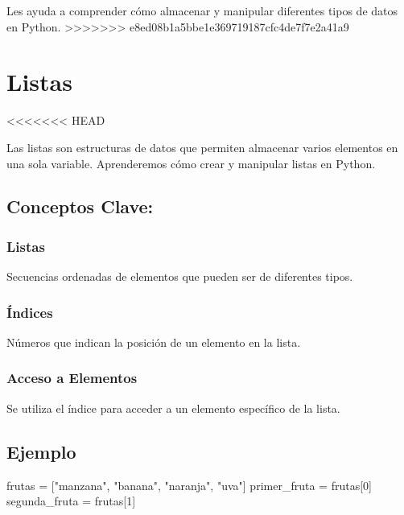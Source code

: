 \documentclass[
  a4paper,
  onepage,
  openany]{scrreprt}
\newenvironment{Shaded}{\begin{snugshade}}{\end{snugshade}}
\newcommand{\DecValTok}[1]{\textcolor[rgb]{0.68,0.00,0.00}{#1}}
\newcommand{\NormalTok}[1]{\textcolor[rgb]{0.00,0.23,0.31}{#1}}
\newcommand{\OperatorTok}[1]{\textcolor[rgb]{0.37,0.37,0.37}{#1}}
\newcommand{\StringTok}[1]{\textcolor[rgb]{0.13,0.47,0.30}{#1}}
\begin{document}
Les ayuda a comprender cómo almacenar y manipular diferentes tipos de
datos en Python.
\textgreater\textgreater\textgreater\textgreater\textgreater\textgreater\textgreater{}
e8ed08b1a5bbe1e369719187cfc4de7f7e2a41a9

\hypertarget{listas}{%
\chapter{Listas}\label{listas}}

\textless\textless\textless\textless\textless\textless\textless{} HEAD

Las listas son estructuras de datos que permiten almacenar varios
elementos en una sola variable. Aprenderemos cómo crear y manipular
listas en Python.

\hypertarget{conceptos-clave-18}{%
\section{Conceptos Clave:}\label{conceptos-clave-18}}

\hypertarget{listas-1}{%
\subsection{Listas}\label{listas-1}}

Secuencias ordenadas de elementos que pueden ser de diferentes tipos.

\hypertarget{uxedndices}{%
\subsection{Índices}\label{uxedndices}}

Números que indican la posición de un elemento en la lista.

\hypertarget{acceso-a-elementos}{%
\subsection{Acceso a Elementos}\label{acceso-a-elementos}}

Se utiliza el índice para acceder a un elemento específico de la lista.

\hypertarget{ejemplo-18}{%
\section{Ejemplo}\label{ejemplo-18}}

\begin{Shaded}
\begin{Highlighting}[]
\NormalTok{frutas }\OperatorTok{=}\NormalTok{ [}\StringTok{"manzana"}\NormalTok{, }\StringTok{"banana"}\NormalTok{, }\StringTok{"naranja"}\NormalTok{, }\StringTok{"uva"}\NormalTok{]}
\NormalTok{primer\_fruta }\OperatorTok{=}\NormalTok{ frutas[}\DecValTok{0}\NormalTok{]}
\NormalTok{segunda\_fruta }\OperatorTok{=}\NormalTok{ frutas[}\DecValTok{1}\NormalTok{]}
\end{Highlighting}
\end{Shaded}
\end{document}
